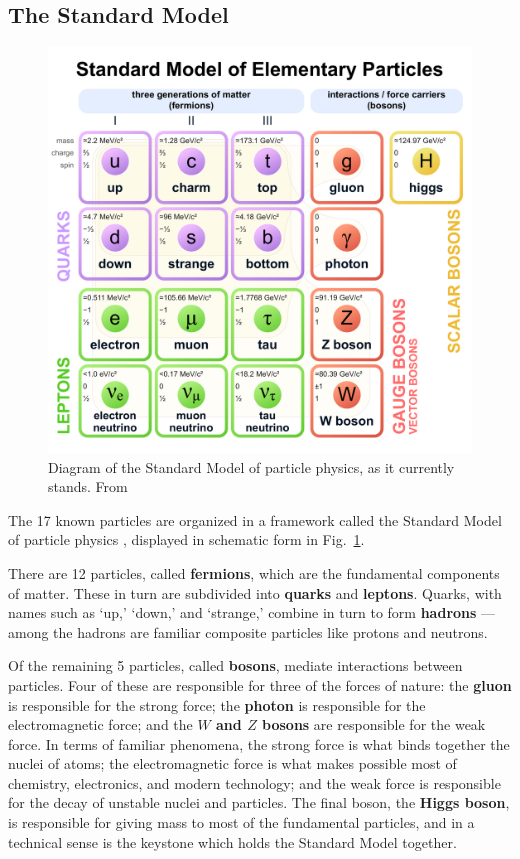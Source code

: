 \documentclass[../thesis.tex]{subfiles}
\begin{document}
\subsection{The Standard Model}
	\begin{figure}
	\begin{centering}
		\includegraphics[width=\textwidth]{figures/Standard_Model_of_Elementary_Particles.pdf}
		\caption{\label{intro-fig:standard model}Diagram of the Standard Model of particle physics, as it currently stands. From \cite{cush_standard_2019}}
	\end{centering}
	\end{figure} 
	The 17 known particles are organized in a framework called the Standard Model of particle physics \cite{larkoski_elementary_2019-1,schwartz_quantum_2014}, displayed in schematic form in Fig.~\ref{intro-fig:standard model}.

	There are 12 particles, called \textbf{fermions}, which are the fundamental components of matter. These in turn are subdivided into \textbf{quarks} and \textbf{leptons}. Quarks, with names such as `up,' `down,' and `strange,' combine in turn to form \textbf{hadrons} --- among the hadrons are familiar composite particles like protons and neutrons. 

	Of the remaining 5 particles, called \textbf{bosons}, mediate interactions between particles. Four of these are responsible for three of the forces of nature: the \textbf{gluon} is responsible for the strong force; the \textbf{photon} is responsible for the electromagnetic force; and the \textbf{$W$ and $Z$ bosons} are responsible for the weak force. In terms of familiar phenomena, the strong force is what binds together the nuclei of atoms; the electromagnetic force is what makes possible most of chemistry, electronics, and modern technology; and the weak force is responsible for the decay of unstable nuclei and particles. The final boson, the \textbf{Higgs boson}, is responsible for giving mass to most of the fundamental particles, and in a technical sense is the keystone which holds the Standard Model together.
\end{document}
